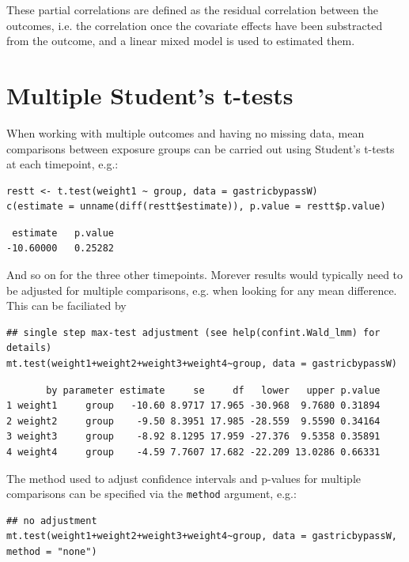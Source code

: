\documentclass[12pt]{article}
\begin{document}
These partial correlations are defined as the residual correlation
between the outcomes, i.e. the correlation once the covariate effects
have been substracted from the outcome, and a linear mixed model is
used to estimated them.

\clearpage

\section{Multiple Student's t-tests}
\label{sec:orgb8f1d72}

When working with multiple outcomes and having no missing data, mean
comparisons between exposure groups can be carried out using Student's
t-tests at each timepoint, e.g.:
\lstset{language=r,label= ,caption= ,captionpos=b,numbers=none}
\begin{lstlisting}
restt <- t.test(weight1 ~ group, data = gastricbypassW)
c(estimate = unname(diff(restt$estimate)), p.value = restt$p.value)
\end{lstlisting}

\begin{verbatim}
 estimate   p.value 
-10.60000   0.25282
\end{verbatim}


And so on for the three other timepoints. Morever results would
typically need to be adjusted for multiple comparisons, e.g. when
looking for any mean difference. This can be faciliated by
\lstset{language=r,label= ,caption= ,captionpos=b,numbers=none}
\begin{lstlisting}
## single step max-test adjustment (see help(confint.Wald_lmm) for details)
mt.test(weight1+weight2+weight3+weight4~group, data = gastricbypassW)
\end{lstlisting}

\begin{verbatim}
       by parameter estimate     se     df   lower   upper p.value
1 weight1     group   -10.60 8.9717 17.965 -30.968  9.7680 0.31894
2 weight2     group    -9.50 8.3951 17.985 -28.559  9.5590 0.34164
3 weight3     group    -8.92 8.1295 17.959 -27.376  9.5358 0.35891
4 weight4     group    -4.59 7.7607 17.682 -22.209 13.0286 0.66331
\end{verbatim}


The method used to adjust confidence intervals and p-values for
multiple comparisons can be specified via the \texttt{method} argument, e.g.:
\lstset{language=r,label= ,caption= ,captionpos=b,numbers=none}
\begin{lstlisting}
## no adjustment
mt.test(weight1+weight2+weight3+weight4~group, data = gastricbypassW, method = "none")
\end{lstlisting}
\end{document}
